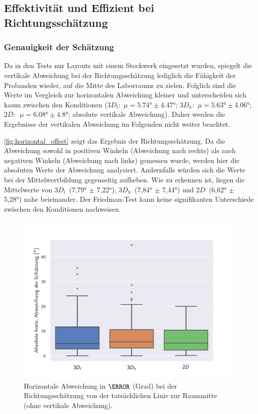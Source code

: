 \subsection{Effektivität und Effizient bei Richtungsschätzung}

\subsubsection*{Genauigkeit der Schätzung}
Da in den Tests nur Layouts mit einem Stockwerk eingesetzt wurden, spiegelt die vertikale Abweichung bei der Richtungsschätzung lediglich die Fähigkeit der Probanden wieder, auf die Mitte des Laborraums zu zielen.
Folglich sind die Werte im Vergleich zur horizontalen Abweichung kleiner und unterscheiden sich kaum zwischen den Konditionen (\mbox{$3D_l$: $\mu = \ang{5,74} \pm \ang{4,47}$}; \mbox{$3D_h$: $\mu = \ang{5,63} \pm \ang{4,06}$}; \mbox{$2D:$ $\mu = \ang{6,08} \pm \ang{4,8}$}; absolute vertikale Abweichung).
Daher werden die Ergebnisse der vertikalen Abweichung im Folgenden nicht weiter beachtet.

\autoref{fig:horizontal_offset} zeigt das Ergebnis der Richtungsschätzung.
Da die Abweichung sowohl in positiven Winkeln (Abweichung nach rechts) als auch negativen Winkeln (Abweichung nach links) gemessen wurde, werden hier die absoluten Werte der Abweichung analysiert.
Andernfalls würden sich die Werte bei der Mittelwertbildung gegenseitig aufheben.
Wie zu erkennen ist, liegen die Mittelwerte von $3D_l$~(\ang{7,79} $\pm$ \ang{7,22}), $3D_h$~(\ang{7,84} $\pm$ \ang{7,44}) und $2D$~(\ang{6,62} $\pm$ \ang{5,28}) nahe beieinander.
Der Friedman-Test kann keine signifikanten Unterschiede zwischen den Konditionen nachweisen.
\begin{figure}[h]
    \centering
    \includegraphics[trim={0.5cm, 0.5cm, 1.75cm, 1.5cm}, clip, height=0.45\textheight]{figures/analysis/horizontal_offset}
    \caption{Horizontale Abweichung in $\degree$ (Grad) bei der Richtungsschätzung von der tatsächlichen Linie zur Raummitte (ohne vertikale Abweichung).}
    \label{fig:horizontal_offset}
\end{figure}

